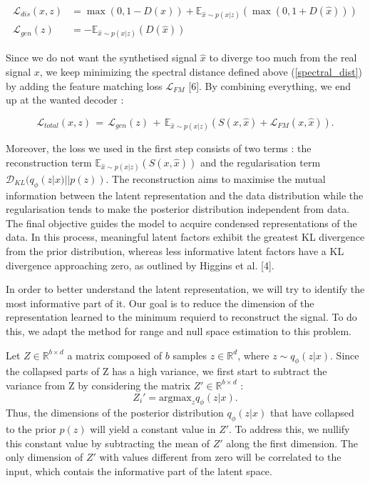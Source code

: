 \documentclass{article}
\begin{document}
\begin{align}
    \mathcal{L}_{dis}(x,z) &= \max(0, 1 - D(x)) + \mathbb{E}_{\hat x \sim p(x|z)}(\max(0, 1 + D(\hat x))) \\
    \mathcal{L}_{gen}(z) &= -\mathbb{E}_{\hat x \sim p(x|z)}(D(\hat x))
\end{align}

Since we do not want the synthetised signal $\hat x$ to diverge too much from the real signal $x$, we keep minimizing the spectral distance defined above (\ref{spectral_dist}) by adding the feature matching loss $\mathcal{L}_{FM}$ [6]. By combining everything, we end up at the wanted decoder :

\begin{equation}
    \mathcal{L}_{total} (x,z) \,=\, \mathcal{L}_{gen}(z)\,+\,\mathbb{E}_{\hat x \sim p(x|z)}(S(x, \hat x ) + \mathcal{L}_{FM}(x, \hat x)).
\end{equation}



Moreover, the loss we used in the first step consists of two terms : the  reconstruction term $\mathbb{E}_{\hat{x} \sim p(x|z)}(S(x,\hat x))$ and the regularisation term $\mathcal{D}_{KL}(q_\phi (z|x)||p(z))$. The reconstruction aims to maximise the mutual information between the latent representation and the data distribution while the regularisation tends to make the posterior distribution independent from data. The final objective guides the model to acquire condensed representations of the data. In this process, meaningful latent factors exhibit the greatest KL divergence from the prior distribution, whereas less informative latent factors have a KL divergence approaching zero, as outlined by Higgins et al. [4].

In order to better understand the latent representation, we will try to identify the most informative part of it. Our goal is to reduce the dimension of the representation learned to the minimum requierd to reconstruct the signal. To do this, we adapt the method for range and null space estimation to this problem.

Let $Z \in \mathbb{R}^{b \times d}$ a matrix composed of $b$ samples $z \in \mathbb{R}^d$, where $z \sim q_\phi(z|x)$. Since the collapsed parts of Z has a high variance, we first start to subtract the variance from Z by considering the matrix $Z' \in \mathbb{R}^{b \times d}$ :
\begin{equation}
    Z_i' = \text{argmax}_{z} q_\phi (z|x).
\end{equation}
Thus, the dimensions of the posterior distribution \(q_{\phi}(z|x)\) that have collapsed to the prior \(p(z)\) will yield a constant value in \(Z'\). To address this, we nullify this constant value by subtracting the mean of \(Z'\) along the first dimension. The only dimension of $Z'$ with values different from zero will be correlated to the input, which contais the informative part of the latent space.
\end{document}
